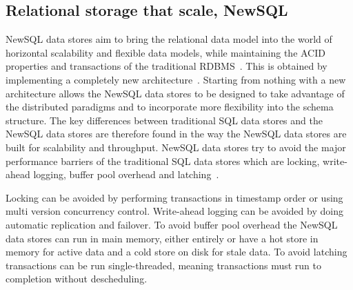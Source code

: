 %
%
%
%

\subsection{Relational storage that scale, NewSQL}
\label{sec:newsql}
NewSQL data stores aim to bring the relational data model into the world of horizontal scalability and flexible data models, while maintaining the ACID properties and transactions of the traditional RDBMS~\cite{Cattell:ScalableSQLAndNoSQLDataStores}.
This is obtained by implementing a completely new architecture~\cite{CORBETT:SpannerGooglesGloballyDistributedDatabase}.
Starting from nothing with a new architecture allows the NewSQL data stores to be designed to take advantage of the distributed paradigms and to incorporate more flexibility into the schema structure.
The key differences between traditional SQL data stores and the NewSQL data stores are therefore found in the way the NewSQL data stores are built for scalability and throughput.
NewSQL data stores try to avoid the major performance barriers of the traditional SQL data stores which are locking, write-ahead logging, buffer pool overhead and latching~\cite{Stonebraker:NewSQLvsNoSQLForNewOLTP}.

Locking can be avoided by performing transactions in timestamp order or using multi version concurrency control.
Write-ahead logging can be avoided by doing automatic replication and failover.
To avoid buffer pool overhead the NewSQL data stores can run in main memory, either entirely or have a hot store in memory for active data and a cold store on disk for stale data.
To avoid latching transactions can be run single-threaded, meaning transactions must run to completion without descheduling.

